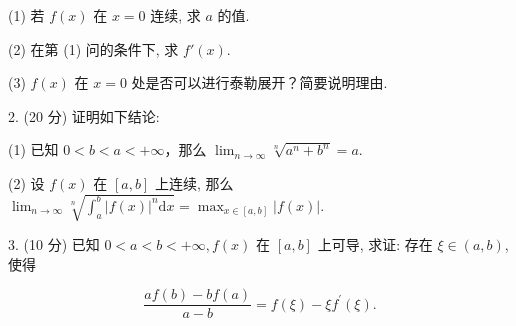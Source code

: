 \documentclass{examcollection}
\renewcommand{\displayformula}[1]{\[#1\]}
\begin{document}
{\begin{minipage}{\textwidth}
(1) 若 $f(x)$ 在 $x = 0$ 连续, 求 $a$ 的值.\par
(2) 在第 (1) 问的条件下, 求 $f'(x)$.\par
(3) $f(x)$ 在 $x = 0$ 处是否可以进行泰勒展开？简要说明理由.\par
2. (20 分) 证明如下结论:\par
(1) 已知 $0 < b < a < +\infty$，那么 $\lim_{n \to \infty} \sqrt[n]{a^n + b^n} = a$.\par
(2) 设 $f(x)$ 在 $[a, b]$ 上连续, 那么 $\lim_{n \to \infty} \sqrt[n]{\int_{a}^{b} |f(x)|^{n} \mathrm{d}x} = \max_{x \in [a, b]} |f(x)|$.\par
3. (10 分) 已知 $0 < a < b < +\infty, f(x)$ 在 $[a, b]$ 上可导, 求证: 存在 $\xi \in (a, b)$, 使得\par
\displayformula{\frac {a f (b) - b f (a)}{a - b} = f (\xi) - \xi f ^ {\prime} (\xi).}\par
\end{minipage}}
\ifdim\dimexpr\ht\proofbox+\dp\proofbox\relax>\textheight
\noindent\resizebox{!}{\textheight}{\usebox{\proofbox}}\else\noindent\usebox{\proofbox}\fi\clearpage
\end{document}
